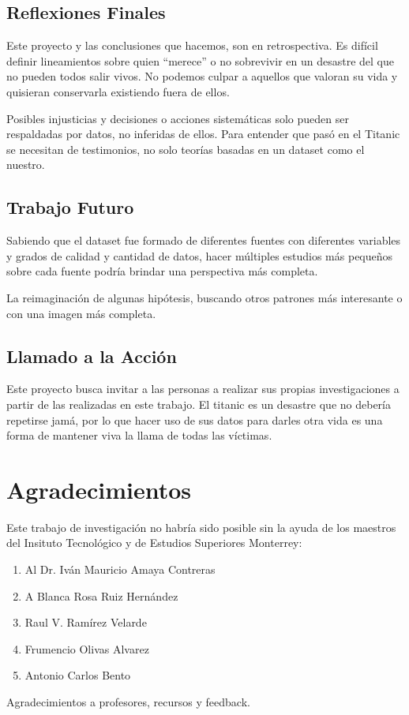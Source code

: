 \documentclass[conference]{IEEEtran}
\begin{document}
\subsection{Reflexiones Finales}
Este proyecto y las conclusiones que hacemos, son en retrospectiva. Es
difícil definir lineamientos sobre quien “merece” o no sobrevivir en un
desastre del que no pueden todos salir vivos. No podemos culpar a aquellos
que valoran su vida y quisieran conservarla existiendo fuera de ellos.

Posibles injusticias y decisiones o acciones sistemáticas solo pueden ser
respaldadas por datos, no inferidas de ellos. Para entender que pasó en el
Titanic se necesitan de testimonios, no solo teorías basadas en un dataset
como el nuestro.

\subsection{Trabajo Futuro}
Sabiendo que el dataset fue formado de diferentes fuentes con diferentes variables y grados de calidad y cantidad de datos, hacer múltiples estudios más pequeños sobre cada fuente podría brindar una perspectiva más completa.

La reimaginación de algunas hipótesis, buscando otros patrones más interesante o con una imagen más completa.

\subsection{Llamado a la Acción}
Este proyecto busca invitar a las personas a realizar sus propias investigaciones a partir de las realizadas en este trabajo. El titanic es un desastre que no debería repetirse jamá, por lo que hacer uso de sus datos para darles otra vida es una forma de mantener viva la llama de todas las víctimas.

\section*{Agradecimientos}
Este trabajo de investigación no habría sido posible sin la ayuda de los maestros del Insituto Tecnológico y de Estudios Superiores Monterrey:
\begin{enumerate}
    \item Al Dr. Iván Mauricio Amaya Contreras
    \item A Blanca Rosa Ruiz Hernández
    \item Raul V. Ramírez Velarde
    \item Frumencio Olivas Alvarez
    \item Antonio Carlos Bento
\end{enumerate}
Agradecimientos a profesores, recursos y feedback.
\end{document}
